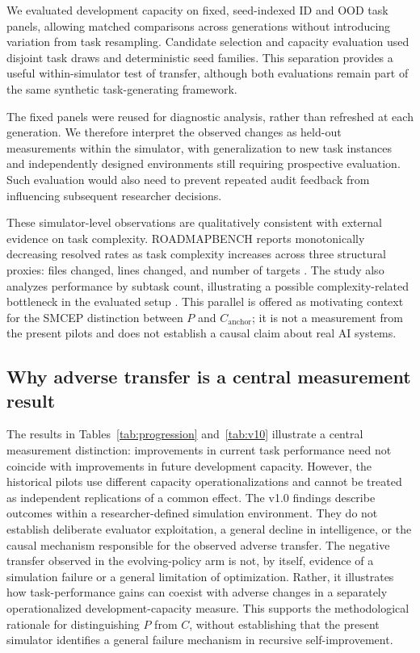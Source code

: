 \documentclass[11pt,a4paper]{article}
\begin{document}
We evaluated development capacity on fixed, seed-indexed ID and OOD task panels, allowing matched comparisons across generations without introducing variation from task resampling. Candidate selection and capacity evaluation used disjoint task draws and deterministic seed families. This separation provides a useful within-simulator test of transfer, although both evaluations remain part of the same synthetic task-generating framework.

The fixed panels were reused for diagnostic analysis, rather than refreshed at each generation. We therefore interpret the observed changes as held-out measurements within the simulator, with generalization to new task instances and independently designed environments still requiring prospective evaluation. Such evaluation would also need to prevent repeated audit feedback
from influencing subsequent researcher decisions.

These simulator-level observations are qualitatively consistent with external evidence on task complexity. ROADMAPBENCH reports monotonically decreasing resolved rates as task complexity increases across three structural proxies: files changed, lines changed, and number of targets \cite{xu2026roadmapbench}. The study also analyzes performance by subtask count, illustrating a possible complexity-related bottleneck in the evaluated setup \cite{xu2026roadmapbench}. This parallel is offered as motivating context for the SMCEP distinction between $P$ and $C_{\mathrm{anchor}}$; it is not a measurement from the present pilots and does not establish a causal claim about real AI systems.

\subsection{Why adverse transfer is a central measurement result}
The results in Tables~\ref{tab:progression} and~\ref{tab:v10} illustrate a central measurement distinction: improvements in current task performance need not coincide with improvements in future development capacity. However, the historical pilots use different capacity operationalizations and cannot be treated as independent replications of a common effect. The v1.0 findings describe outcomes within a researcher-defined simulation environment. They do not establish deliberate evaluator
exploitation, a general decline in intelligence, or the causal mechanism responsible for the observed adverse transfer. The negative transfer observed in the evolving-policy arm is not, by itself, evidence of a simulation failure or a general limitation of optimization. Rather, it illustrates how task-performance gains can coexist with adverse changes in a separately operationalized development-capacity measure. This supports the methodological rationale for distinguishing \(P\) from \(C\), without establishing that the present simulator identifies a general failure mechanism in recursive self-improvement.
\end{document}
